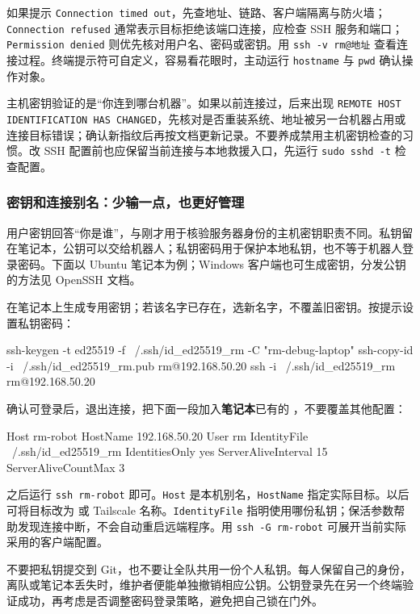 如果提示 \texttt{Connection timed out}，先查地址、链路、客户端隔离与防火墙；\texttt{Connection refused} 通常表示目标拒绝该端口连接，应检查 SSH 服务和端口；\texttt{Permission denied} 则优先核对用户名、密码或密钥。用 \texttt{ssh -v rm@地址} 查看连接过程。终端提示符可自定义，容易看花眼时，主动运行 \texttt{hostname} 与 \texttt{pwd} 确认操作对象。

\begin{note}
主机密钥验证的是“你连到哪台机器”。如果以前连接过，后来出现 \texttt{REMOTE HOST IDENTIFICATION HAS CHANGED}，先核对是否重装系统、地址被另一台机器占用或连接目标错误；确认新指纹后再按文档更新记录。不要养成禁用主机密钥检查的习惯。改 SSH 配置前也应保留当前连接与本地救援入口，先运行 \texttt{sudo sshd -t} 检查配置。
\end{note}

\subsubsection{密钥和连接别名：少输一点，也更好管理}

用户密钥回答“你是谁”，与刚才用于核验服务器身份的主机密钥职责不同。私钥留在笔记本，公钥可以交给机器人；私钥密码用于保护本地私钥，也不等于机器人登录密码。下面以 Ubuntu 笔记本为例；Windows 客户端也可生成密钥，分发公钥的方法见 OpenSSH 文档。

\begin{example}[给自己的调试连接建档]
在笔记本上生成专用密钥；若该名字已存在，选新名字，不覆盖旧密钥。按提示设置私钥密码：
\begin{tbash}
ssh-keygen -t ed25519 -f ~/.ssh/id_ed25519_rm -C "rm-debug-laptop"
ssh-copy-id -i ~/.ssh/id_ed25519_rm.pub rm@192.168.50.20
ssh -i ~/.ssh/id_ed25519_rm rm@192.168.50.20
\end{tbash}
确认可登录后，退出连接，把下面一段加入\textbf{笔记本}已有的 ，不要覆盖其他配置：
\begin{tbash}
Host rm-robot
    HostName 192.168.50.20
    User rm
    IdentityFile ~/.ssh/id_ed25519_rm
    IdentitiesOnly yes
    ServerAliveInterval 15
    ServerAliveCountMax 3
\end{tbash}
之后运行 \texttt{ssh rm-robot} 即可。\texttt{Host} 是本机别名，\texttt{HostName} 指定实际目标。以后可将目标改为  或 Tailscale 名称。\texttt{IdentityFile} 指明使用哪份私钥；保活参数帮助发现连接中断，不会自动重启远端程序。用 \texttt{ssh -G rm-robot} 可展开当前实际采用的客户端配置。
\end{example}

不要把私钥提交到 Git，也不要让全队共用一份个人私钥。每人保留自己的身份，离队或笔记本丢失时，维护者便能单独撤销相应公钥。公钥登录先在另一个终端验证成功，再考虑是否调整密码登录策略，避免把自己锁在门外。

